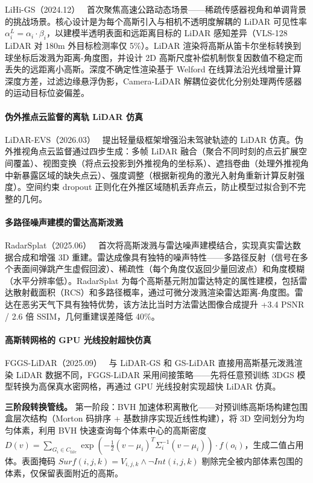 LiHi-GS（2024.12）~\cite{2412_15447} 首次聚焦高速公路动态场景——稀疏传感器视角和单调背景的挑战场景。核心设计是为每个高斯引入与相机不透明度解耦的 LiDAR 可见性率 $\alpha_i^L = \alpha_i \cdot \beta_i$，以建模半透明表面和远距离目标的 LiDAR 感知差异（VLS-128 LiDAR 对 180m 外目标检测率仅 5\%）。LiDAR 渲染将高斯从笛卡尔坐标转换到球坐标后泼溅为距离-角度图，并设计 2D 高斯尺度补偿机制恢复因数值不稳定而丢失的远距离小高斯。深度不确定性渲染基于 Welford 在线算法沿光线增量计算深度方差，过滤边缘悬浮伪影，Camera-LiDAR 解耦位姿优化分别处理两传感器的运动目标位姿偏差。

\paragraph{伪外推点云监督的离轨 LiDAR 仿真}

LiDAR-EVS（2026.03）~\cite{2603_14763} 提出轻量级框架增强沿未驾驶轨迹的 LiDAR 仿真。伪外推视角点云监督通过四步生成：多帧 LiDAR 融合（聚合不同时刻的点云扩展空间覆盖）、视图变换（将点云投影到外推视角的坐标系）、遮挡卷曲（处理外推视角中新暴露区域的缺失点云）、强度调整（根据新视角的激光入射角重新计算反射强度）。空间约束 dropout 正则化在外推区域随机丢弃点云，防止模型过拟合到不完整的几何。

\paragraph{多路径噪声建模的雷达高斯泼溅}

RadarSplat（2025.06）~\cite{2506_01379} 首次将高斯泼溅与雷达噪声建模结合，实现真实雷达数据合成和增强 3D 重建。雷达成像具有独特的噪声特性——多路径反射（信号在多个表面间弹跳产生虚假回波）、稀疏性（每个角度仅返回少量回波点）和角度模糊（水平分辨率低）。RadarSplat 为每个高斯基元附加雷达特定的属性建模，包括雷达散射截面积（RCS）和多路径概率，通过可微分泼溅渲染雷达距离-角度图。雷达在恶劣天气下具有独特优势，该方法比当时方法雷达图像合成提升 +3.4 PSNR / 2.6 倍 SSIM，几何重建误差降低 40\%。

\paragraph{高斯转网格的 GPU 光线投射超快仿真}

FGGS-LiDAR（2025.09）~\cite{2509_17390} 与 LiDAR-GS 和 GS-LiDAR 直接用高斯基元泼溅渲染 LiDAR 数据不同，FGGS-LiDAR 采用间接策略——先将任意预训练 3DGS 模型转换为高保真水密网格，再通过 GPU 光线投射实现超快 LiDAR 仿真。

\textbf{三阶段转换管线。} 第一阶段：BVH 加速体积离散化——对预训练高斯场构建包围盒层次结构（Morton 码排序 + 基数排序实现近线性构建），将 3D 空间划分为均匀体素，利用 BVH 快速查询每个体素中心的高斯密度 $D(v) = \sum_{G_i \in C_{tile}} \exp(-\frac{1}{2}(v - \mu_i)^T \Sigma_i^{-1}(v - \mu_i)) \cdot f(o_i)$，生成二值占用体。表面掩码 $Surf(i,j,k) = V_{i,j,k} \land \neg Int(i,j,k)$ 剔除完全被内部体素包围的体素，仅保留表面附近的高斯。

